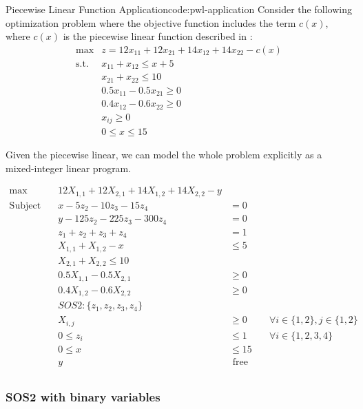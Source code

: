 \begin{examplewithcode}{Piecewise Linear Function Application}{code:pwl-application}
\label{example:pwl-application}
Consider the following optimization problem where the objective function includes the term $c(x)$, where $c(x)$ is the piecewise linear function described in :
\begin{align}
\max & z = 12x_{11} + 12x_{21} + 14x_{12} + 14x_{22} - c(x)\\
\text{s.t.} & x_{11} + x_{12} \leq x + 5\\
& x_{21} + x_{22} \leq 10\\
& 0.5 x_{11} - 0.5x_{21} \geq 0\\
& 0.4 x_{12} - 0.6 x_{22} \geq 0\\
& x_{ij} \geq 0\\
& 0 \leq x \leq 15
\end{align}

Given the piecewise linear, we can model the whole problem explicitly as a mixed-integer linear program.

 \begin{equation}
 \begin{array}{rrlr}
 \max\quad & 12 X_{1,1} + 12 X_{2,1} + 14 X_{1,2} + 14 X_{2,2} - y\\
\text{Subject to} \quad & x - 5 z_{2} - 10 z_{3} - 15 z_{4} &= 0\\
 & y - 125 z_{2} - 225 z_{3} - 300 z_{4} &= 0\\
 & z_{1} + z_{2} + z_{3} + z_{4} &= 1\\
 & X_{1,1} + X_{1,2} - x &\leq 5\\
 & X_{2,1} + X_{2,2} \leq 10\\
 & 0.5 X_{1,1} - 0.5 X_{2,1} &\geq 0\\
 & 0.4 X_{1,2} - 0.6 X_{2,2} &\geq 0\\
 & SOS2: \{z_1, z_2, z_3, z_4\}\\
 & X_{i,j} &\geq 0 &\quad\forall i \in \{1,2\}, j \in \{1,2\}\\
 & 0 \leq z_{i} &\leq 1 &\quad\forall i \in \{1,2,3,4\}\\
 & 0 \leq x &\leq 15\\
 & y & \text{ free} \\
\end{array}
\end{equation}
\end{examplewithcode}


\subsubsection{SOS2 with binary variables}


